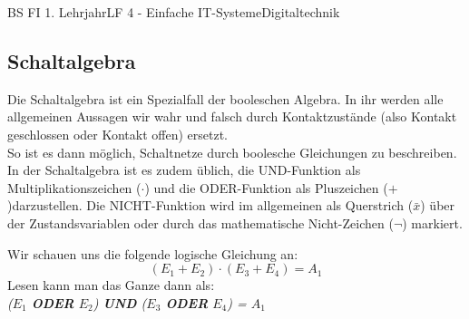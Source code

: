 \documentclass[11pt,twocolumn,oneside,openany,headings=optiontotoc,11pt,numbers=noenddot]{article}
\begin{document}
\begin{worksheet}{BS FI 1. Lehrjahr}{LF 4 - Einfache IT-Systeme}{Digitaltechnik}
		\subsection{Schaltalgebra}
		Die Schaltalgebra ist ein Spezialfall der booleschen Algebra. In ihr werden alle allgemeinen Aussagen wir \glqq{}wahr\grqq{} und \glqq{}falsch\grqq{} durch Kontaktzustände (also Kontakt geschlossen oder Kontakt offen) ersetzt.\\
		So ist es dann möglich, Schaltnetze durch boolesche Gleichungen zu beschreiben. In der Schaltalgebra ist es zudem üblich, die UND-Funktion als Multiplikationszeichen (\(\cdot\)) und die ODER-Funktion als Pluszeichen (\(+\))darzustellen. Die NICHT-Funktion wird im allgemeinen als Querstrich (\(\bar{x}\)) über der Zustandsvariablen oder durch das mathematische Nicht-Zeichen (\(\neg\)) markiert.\\
		\par\noindent
		Wir schauen uns die folgende \glqq{}logische Gleichung\grqq{} an:\[(E_1 + E_2)\cdot(E_3+E_4) = A_1\]
		Lesen kann man das Ganze dann als:\\
		\textit{(\(E_1\) \textbf{ODER} \(E_2\)) \textbf{UND} (\(E_3\) \textbf{ODER} \(E_4\)) = \(A_1\)}

\end{worksheet}
\end{document}
